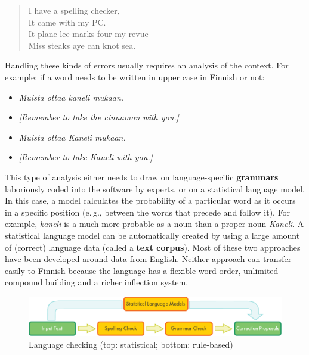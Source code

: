 \begin{multicols}{2}
\begin{quote}
  I have a spelling checker,\\
  It came with my PC.\\
  It plane lee marks four my revue\\
  Miss steaks aye can knot sea.~\cite{Surprise}
\end{quote}

Handling these kinds of errors usually requires an analysis of the
context. For example: if a word needs to be written in upper case in
Finnish or not:
\begin{itemize}
\item[] {\foreignlanguage{finnish}{\textit{Muista ottaa kaneli mukaan.}}} 
\item   {\textit{[Remember to take the cinnamon with you.]}}
\item[] {\foreignlanguage{finnish}{\textit{Muista ottaa Kaneli mukaan.}}}
\item   {\textit{[Remember to take Kaneli with you.]} }
\end{itemize}
This type of analysis either needs to draw on language-specific
\textbf{grammars} laboriously coded into the software by experts, or on a
statistical language model. In this case, a model calculates the
probability of a particular word as it occurs in a specific position
(e.\,g., between the words that precede and follow it). For example,
 {\foreignlanguage{finnish}{\textit{kaneli}}} is a much more probable
 as a noun than a proper noun
 {\foreignlanguage{finnish}{\textit{Kaneli}}}.
A statistical language model can be automatically created by using a
large amount of (correct) language data (called a \textbf{text corpus}).
Most
of these two approaches have been developed around data from
English. Neither approach can transfer easily to Finnish because the
language has a flexible word order, unlimited compound building and a
richer inflection system.

\begin{figure}[t]
  \center
  \includegraphics[width=\textwidth]{../_media/english/language_checking}
  \caption{Language checking (top: statistical; bottom: rule-based)}
  \label{fig:langcheckingarch-eng}
\end{figure}


\end{multicols}
